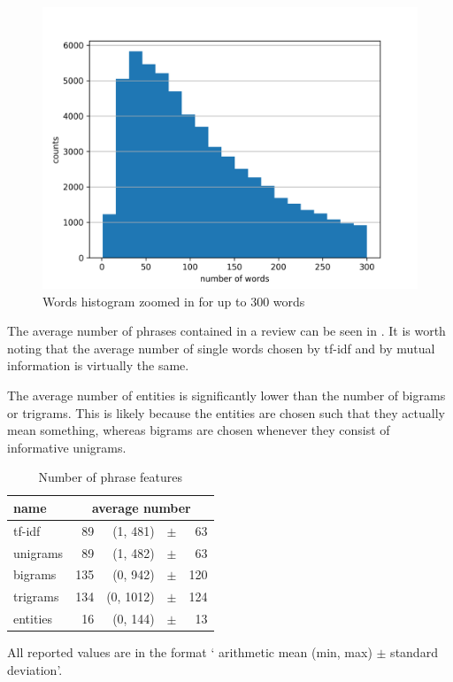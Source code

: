 \begin{figure}[ht]\centering
	\includegraphics[width=130mm]{figures/word_hist_cropped.png}
\caption{Words histogram zoomed in for up to 300 words}\label{fig:word_hist_crop}
\end{figure}


The average number of phrases contained in a review can be seen in .
It is worth noting that the average number of single words chosen by tf-idf and by mutual information is virtually the same.

The average number of entities is significantly lower than the number of bigrams or trigrams.
This is likely because the entities are chosen such that they actually mean something,
whereas bigrams are chosen whenever they consist of informative unigrams.
\begin{table}[h!]
\centering
\begin{tabular}{lr@{~}r@{~}r@{~}r}
\toprule
\textbf{name}	& \multicolumn{4}{c}{\textbf{average number}} \\
\midrule
tf-idf  & 89 & (1, 481) & $\pm$& 63 \\
unigrams & 89 & (1, 482) & $\pm$& 63 \\
bigrams & 135 & (0, 942) & $\pm$ &120 \\
trigrams & 134 & (0, 1012) & $\pm$& 124 \\
entities & 16 & (0, 144) & $\pm$ &13 \\
\bottomrule
\end{tabular}


\caption{Number of phrase features}\label{tab:phrase_feat_nu}
All reported values are in the format ` arithmetic mean (min, max) $\pm$ standard deviation'.
\end{table}


